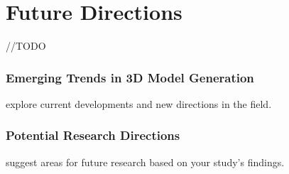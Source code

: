 \chapter{Future Directions}
\label{ch:future}
//TODO

\subsection{Emerging Trends in 3D Model Generation}
explore current developments and new directions in the field.

\subsection{Potential Research Directions}
suggest areas for future research based on your study's findings.